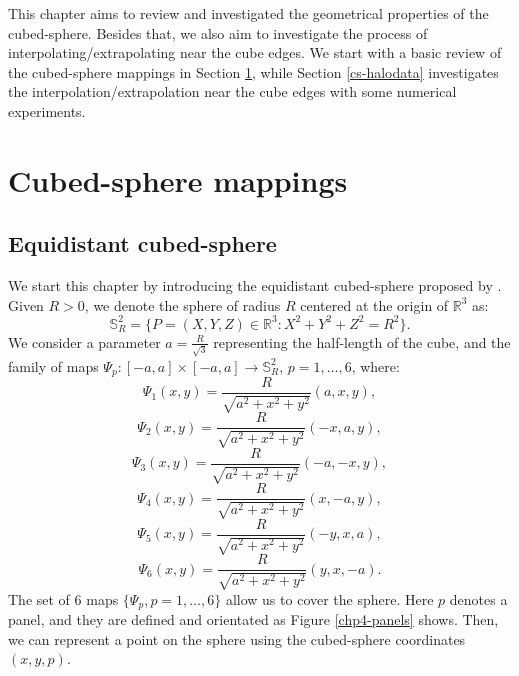 This chapter aims to review and investigated the geometrical properties
of the cubed-sphere. Besides that, we also aim to investigate the process
of interpolating/extrapolating near the cube edges.
We start with a basic review of the cubed-sphere mappings in Section \ref{cs-mappings},
while Section \ref{cs-halodata} investigates the interpolation/extrapolation near the cube
edges with some numerical experiments.

\section{Cubed-sphere mappings}
\label{cs-mappings}
\subsection{Equidistant cubed-sphere}
\label{equidistant-cs}
We start this chapter by introducing the equidistant cubed-sphere proposed by 
\citet{sadourny:1972}. Given $R>0$, we denote the sphere of radius $R$ 
centered at the origin of  $\mathbb{R}^3$ as:
\begin{equation*}
	\mathbb{S}^2_R = \{ P = (X,Y,Z) \in \mathbb{R}^3: X^2 + Y^2 + Z^2 = R^2\}.
\end{equation*}
We consider a parameter $a = \frac{R}{\sqrt{3}}$ representing the half-length of 
the cube, and the family of maps
$\Psi_{p}: [-a,a] \times [-a,a] \to \mathbb{S}^2_R$, $p=1, \ldots, 6$,
where:
\begin{equation*}
	\Psi_{1}(x,y) = \frac{R}{\sqrt{a^2 + x^2 + y^2}}(a, x, y), 
\end{equation*}
\begin{equation*}
	\Psi_{2}(x,y) = \frac{R}{\sqrt{a^2 + x^2 + y^2}}(-x, a, y), 
\end{equation*}
\begin{equation*}
	\Psi_{3}(x,y) = \frac{R}{\sqrt{a^2 + x^2 + y^2}}(-a, -x, y), 
\end{equation*}
\begin{equation*}
	\Psi_{4}(x,y) = \frac{R}{\sqrt{a^2 + x^2 + y^2}}(x, -a, y), 
\end{equation*}
\begin{equation*}
	\Psi_{5}(x,y) = \frac{R}{\sqrt{a^2 + x^2 + y^2}}(-y, x, a), 
\end{equation*}
\begin{equation*}
	\Psi_{6}(x,y) = \frac{R}{\sqrt{a^2 + x^2 + y^2}}(y, x, -a).
\end{equation*}
The set of 6 maps $\{\Psi_{p}, p = 1, \ldots, 6\}$ allow us to cover the sphere.
Here $p$ denotes a panel, and they are defined and orientated as Figure \ref{chp4-panels}
shows. Then, we can represent a point on the sphere using the cubed-sphere coordinates
$(x,y,p)$.

